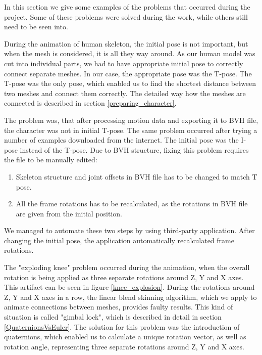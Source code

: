 \documentclass[times, 10pt,twocolumn]{article}
\begin{document}
\label{Problems}
In this section we give some examples of the problems that occurred during the project.
Some of these problems were solved during the work, while others still need to be seen into.


During the animation of human skeleton, the initial pose is not important, but when the mesh is considered,
it is all they way around. As our human model was cut into individual parts,
we had to have appropriate initial pose to correctly connect separate meshes. In our case, the appropriate pose was the T-pose. The T-pose was the only pose, which enabled us to find the shortest distance between two meshes and connect them correctly. The detailed way how the meshes are connected is described in section \ref{preparing_character}.

The problem was, that after processing motion data and exporting it to BVH file, the character was not in initial T-pose.
The same problem occurred after trying a number of examples downloaded from the internet. The initial pose was the I-pose instead of the T-pose.
Due to BVH structure, fixing this problem requires the file to be manually edited:

\begin{enumerate}
\item Skeleton structure and joint offsets in BVH file has to be changed to match T pose.
\item All the frame rotations has to be recalculated, as the rotations in BVH file are given from the initial position.
\end{enumerate}

We managed to automate these two steps by using third-party application. After changing the initial pose, the application automatically recalculated frame rotations.

\label{section_knee_explosion}

The "exploding knee" problem occurred during the animation, when the overall rotation is being applied as three separate rotations around Z, Y and X axes. This artifact can be seen in figure \ref{knee_explosion}.
During the rotations around Z, Y and X axes in a row, the linear blend skinning algorithm, which we apply to animate connections between meshes, provides faulty results. This kind of situation is called "gimbal lock", which is described in detail in section \ref{QuaternionsVsEuler}. The solution for this problem was the introduction of quaternions, which enabled us to calculate a unique rotation vector, as well as rotation angle, representing three separate rotations around Z, Y and X axes.
\end{document}
